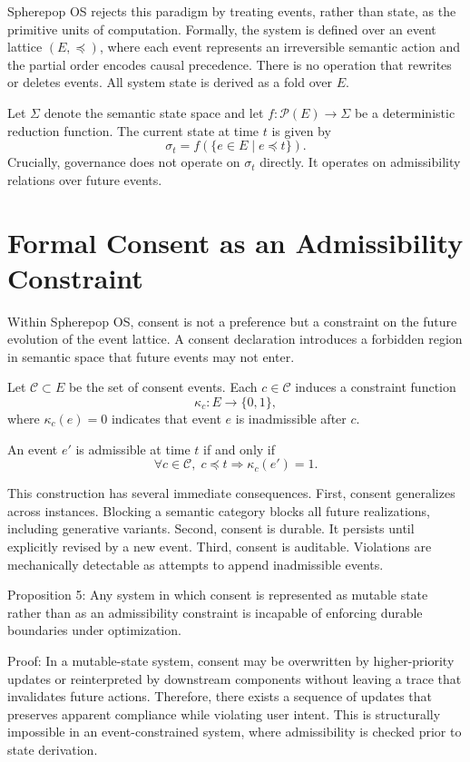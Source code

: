 \documentclass[11pt,oneside]{article}
\begin{document}
Spherepop OS rejects this paradigm by treating events, rather than state, as the primitive units of computation. Formally, the system is defined over an event lattice \( (E, \preceq) \), where each event represents an irreversible semantic action and the partial order encodes causal precedence. There is no operation that rewrites or deletes events. All system state is derived as a fold over \( E \).

Let \( \Sigma \) denote the semantic state space and let \( f: \mathcal{P}(E) \rightarrow \Sigma \) be a deterministic reduction function. The current state at time \( t \) is given by
\[
\sigma_t = f(\{ e \in E \mid e \preceq t \}).
\]
Crucially, governance does not operate on \( \sigma_t \) directly. It operates on admissibility relations over future events.

\section{Formal Consent as an Admissibility Constraint}

Within Spherepop OS, consent is not a preference but a constraint on the future evolution of the event lattice. A consent declaration introduces a forbidden region in semantic space that future events may not enter.

Let \( \mathcal{C} \subset E \) be the set of consent events. Each \( c \in \mathcal{C} \) induces a constraint function
\[
\kappa_c : E \rightarrow \{0,1\},
\]
where \( \kappa_c(e) = 0 \) indicates that event \( e \) is inadmissible after \( c \).

An event \( e' \) is admissible at time \( t \) if and only if
\[
\forall c \in \mathcal{C},\; c \preceq t \Rightarrow \kappa_c(e') = 1.
\]

This construction has several immediate consequences. First, consent generalizes across instances. Blocking a semantic category blocks all future realizations, including generative variants. Second, consent is durable. It persists until explicitly revised by a new event. Third, consent is auditable. Violations are mechanically detectable as attempts to append inadmissible events.

Proposition 5: Any system in which consent is represented as mutable state rather than as an admissibility constraint is incapable of enforcing durable boundaries under optimization.

Proof: In a mutable-state system, consent may be overwritten by higher-priority updates or reinterpreted by downstream components without leaving a trace that invalidates future actions. Therefore, there exists a sequence of updates that preserves apparent compliance while violating user intent. This is structurally impossible in an event-constrained system, where admissibility is checked prior to state derivation.
\end{document}
